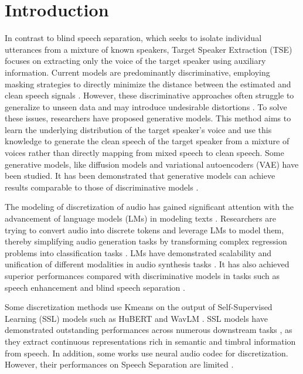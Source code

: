 \documentclass[conference]{IEEEtran}
\begin{document}
        
\section{Introduction}

In contrast to blind speech separation, which seeks to isolate individual utterances from a mixture of known speakers, Target Speaker Extraction (TSE) focuses on extracting only the voice of the target speaker using auxiliary information. Current models are predominantly discriminative, employing masking strategies to directly minimize the distance between the estimated and clean speech signals \cite{luo2019conv,spex_plus,sepformer,sef_net}. However, these discriminative approaches often struggle to generalize to unseen data and may introduce undesirable distortions \cite{distortion}. To solve these issues, researchers have proposed generative models. This method aims to learn the underlying distribution of the target speaker's voice and use this knowledge to generate the clean speech of the target speaker from a mixture of voices rather 
than directly mapping from mixed speech to clean speech. Some generative models, like diffusion
models \cite{target_diff} and variational autoencoders (VAE) \cite{vae} have been studied. It has been demonstrated that generative models can achieve results comparable to those of discriminative models \cite{target_diff,tokensplit}.


The modeling of discretization of audio has gained significant attention with the advancement of language models (LMs) in modeling texts \cite{l1, l2, l3, l4, l5}. Researchers are trying to convert audio into discrete tokens and leverage LMs to 
model them, thereby simplifying audio generation tasks by transforming complex regression problems into classification tasks \cite{dasb}.
LMs have demonstrated scalability and unification of different modalities in audio synthesis tasks \cite{audio_gen,deshmukh2023pengi,chen2023lauragpt}. It has also achieved superior performances compared with discriminative models in
tasks such as speech enhancement \cite{selm,mask_sr} and blind speech separation \cite{tokensplit}.

Some discretization methods \cite{selm,tokensplit,dasb} use Kmeans on the output of Self-Supervised Learning (SSL) models such as HuBERT \cite{hubert} and WavLM \cite{wavlm}. SSL models have demonstrated outstanding performances across numerous downstream tasks \cite{superb}, as they extract continuous representations rich in semantic and timbral information from speech. In addition, some works \cite{laura} use neural audio codec for discretization. However, their performances on Speech Separation are limited \cite{dasb}. 
\end{document}
